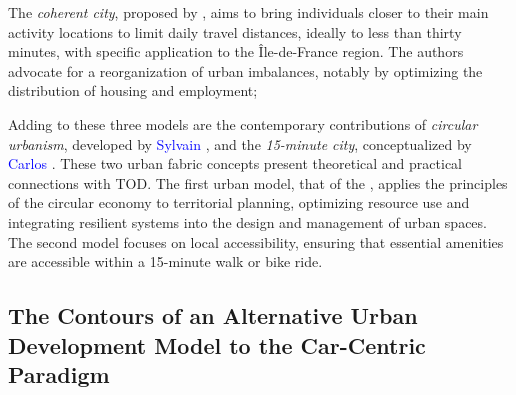 \begin{refsegment}
\begin{customitemize}
\item The \textsl{coherent city}, proposed by \textcolor{blue}{\textcite{korsu_ville_2012}}, aims to bring individuals closer to their main activity locations to limit daily travel distances, ideally to less than thirty minutes, with specific application to the Île-de-France region. The authors advocate for a reorganization of urban imbalances, notably by optimizing the distribution of housing and employment;
\item Adding to these three models are the contemporary contributions of \textsl{circular urbanism}, developed by \textcolor{blue}{Sylvain} \textcolor{blue}{\textcite{grisot_manifeste_2020}}, and the \textsl{15-minute city}, conceptualized by \textcolor{blue}{Carlos} \textcolor{blue}{\textcite{moreno_droit_2020}}. These two urban fabric concepts present theoretical and practical connections with \acrshort{TOD}. The first urban model, that of the  \textcolor{blue}{\autocite[76-80]{chalendar_defi_2021}}, applies the principles of the circular economy to territorial planning, optimizing resource use and integrating resilient systems into the design and management of urban spaces. The second model focuses on local accessibility, ensuring that essential amenities are accessible within a 15-minute walk or bike ride.
\end{customitemize}%

\subsection{The Contours of an Alternative Urban Development Model to the Car-Centric Paradigm
    \label{chap1:tod-presentation-generale-definition}
    }


\end{refsegment}
